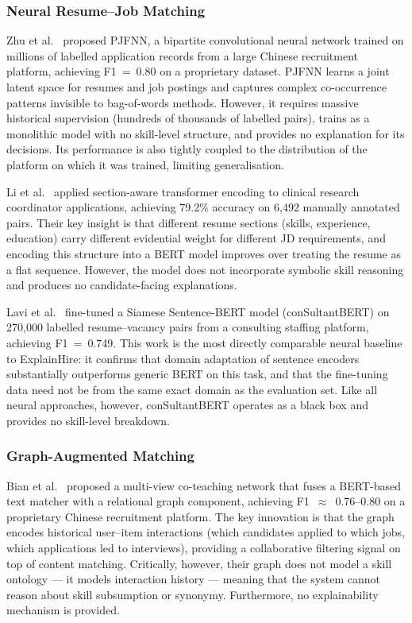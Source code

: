\documentclass[conference]{IEEEtran}
\begin{document}
\subsubsection{Neural Resume--Job Matching}
Zhu et al.~\cite{zhu2018personjobfit} proposed PJFNN, a bipartite
convolutional neural network trained on millions of labelled application
records from a large Chinese recruitment platform, achieving F1~=~0.80 on a
proprietary dataset. PJFNN learns a joint latent space for resumes and job
postings and captures complex co-occurrence patterns invisible to bag-of-words
methods. However, it requires massive historical supervision (hundreds of
thousands of labelled pairs), trains as a monolithic model with no
skill-level structure, and provides no explanation for its decisions. Its
performance is also tightly coupled to the distribution of the platform on
which it was trained, limiting generalisation.

Li et al.~\cite{li2020competence} applied section-aware transformer encoding
to clinical research coordinator applications, achieving 79.2\% accuracy on
6,492 manually annotated pairs. Their key insight is that different resume
sections (skills, experience, education) carry different evidential weight
for different JD requirements, and encoding this structure into a BERT model
improves over treating the resume as a flat sequence. However, the model
does not incorporate symbolic skill reasoning and produces no
candidate-facing explanations.

Lavi et al.~\cite{lavi2021consultantbert} fine-tuned a Siamese Sentence-BERT
model (conSultantBERT) on 270,000 labelled resume--vacancy pairs from a
consulting staffing platform, achieving F1~=~0.749. This work is the most
directly comparable neural baseline to ExplainHire: it confirms that domain
adaptation of sentence encoders substantially outperforms generic BERT on
this task, and that the fine-tuning data need not be from the same exact
domain as the evaluation set. Like all neural approaches, however,
conSultantBERT operates as a black box and provides no skill-level breakdown.

\subsubsection{Graph-Augmented Matching}
Bian et al.~\cite{bian2020multiview} proposed a multi-view co-teaching
network that fuses a BERT-based text matcher with a relational graph
component, achieving F1~$\approx$~0.76--0.80 on a proprietary Chinese
recruitment platform. The key innovation is that the graph encodes
historical user--item interactions (which candidates applied to which jobs,
which applications led to interviews), providing a collaborative filtering
signal on top of content matching. Critically, however, their graph does
not model a skill ontology --- it models interaction history --- meaning
that the system cannot reason about skill subsumption or synonymy.
Furthermore, no explainability mechanism is provided.
\end{document}
